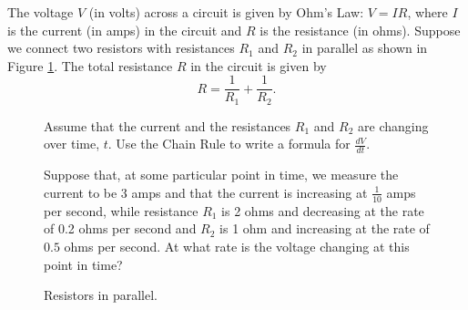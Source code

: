 \begin{activity} \label{A:10.5.3} The voltage $V$ (in volts) across a circuit is given by Ohm's Law: $V = IR$, where $I$ is the current (in amps) in the circuit and $R$ is the resistance (in ohms). Suppose we connect two resistors with resistances $R_1$ and $R_2$ in parallel as shown in Figure \ref{F:10.5.CR_Circuit}. The total resistance $R$ in the circuit is given by
\[R = \frac{1}{R_1} + \frac{1}{R_2}.\]
\begin{figure}[ht]
\begin{minipage}{4in}
        \ba
    \item Assume that the current and the resistances $R_1$ and $R_2$ are changing over time, $t$. Use the Chain Rule to write a formula for $\frac{dV}{dt}$.



    \item Suppose that, at some particular point in time, we measure the current to be 3 amps and that the current is increasing at $\frac{1}{10}$ amps per second, while resistance $R_1$ is 2 ohms and decreasing at the rate of 0.2 ohms per second and $R_2$ is 1 ohm and increasing at the rate of $0.5$ ohms per second. At what rate is the voltage changing at this point in time?



    \ea
\end{minipage} \hspace{0.2in}
\begin{minipage}{1.15in}
\begin{center}
\end{center}
\caption{Resistors in parallel.}
\label{F:10.5.CR_Circuit}
\end{minipage}
\end{figure}


\end{activity}
\begin{smallhint}

\end{smallhint}
\begin{bighint}

\end{bighint}
